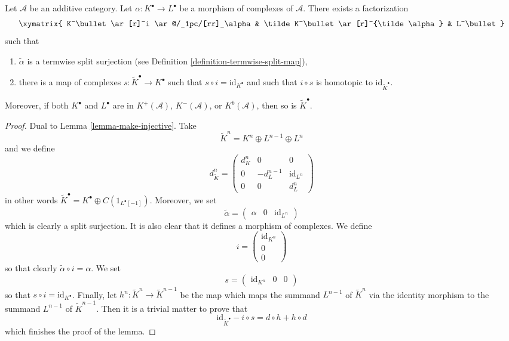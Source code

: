 \begin{lemma}
\label{lemma-make-surjective}
Let $\mathcal{A}$ be an additive category.
Let $\alpha : K^\bullet \to L^\bullet$ be a morphism
of complexes of $\mathcal{A}$.
There exists a factorization
$$
\xymatrix{
K^\bullet \ar[r]^i \ar@/_1pc/[rr]_\alpha &
\tilde K^\bullet \ar[r]^{\tilde \alpha} &
L^\bullet
}
$$
such that
\begin{enumerate}
\item $\tilde \alpha$ is a termwise split surjection (see
Definition \ref{definition-termwise-split-map}),
\item there is a map of complexes $s : \tilde K^\bullet \to K^\bullet$
such that $s \circ i = \text{id}_{K^\bullet}$ and such that
$i \circ s$ is homotopic to $\text{id}_{\tilde K^\bullet}$.
\end{enumerate}
Moreover, if both $K^\bullet$ and $L^\bullet$ are in
$K^{+}(\mathcal{A})$, $K^{-}(\mathcal{A})$, or $K^b(\mathcal{A})$,
then so is $\tilde K^\bullet$.
\end{lemma}

\begin{proof}
Dual to Lemma \ref{lemma-make-injective}.
Take
$$
\tilde K^n = K^n \oplus L^{n - 1} \oplus L^n
$$
and we define
$$
d^n_{\tilde K} =
\left(
\begin{matrix}
d^n_K & 0 & 0 \\
0 & - d^{n - 1}_L & \text{id}_{L^n} \\
0 & 0 & d^n_L
\end{matrix}
\right)
$$
in other words $\tilde K^\bullet = K^\bullet \oplus C(1_{L^\bullet[-1]})$.
Moreover, we set
$$
\tilde \alpha =
\left(
\begin{matrix}
\alpha &
0 &
\text{id}_{L^n}
\end{matrix}
\right)
$$
which is clearly a split surjection. It is also clear that it defines a
morphism of complexes. We define
$$
i =
\left(
\begin{matrix}
\text{id}_{K^n} \\
0 \\
0
\end{matrix}
\right)
$$
so that clearly $\tilde \alpha \circ i = \alpha$. We set
$$
s =
\left(
\begin{matrix}
\text{id}_{K^n} &
0 &
0
\end{matrix}
\right)
$$
so that $s \circ i = \text{id}_{K^\bullet}$. Finally,
let $h^n : \tilde K^n \to \tilde K^{n - 1}$ be the map
which maps the summand $L^{n - 1}$ of $\tilde K^n$ via the identity morphism
to the summand $L^{n - 1}$ of $\tilde K^{n - 1}$. Then it is a trivial matter
to prove that
$$
\text{id}_{\tilde K^\bullet} - i \circ s
=
d \circ h + h \circ d
$$
which finishes the proof of the lemma.
\end{proof}

